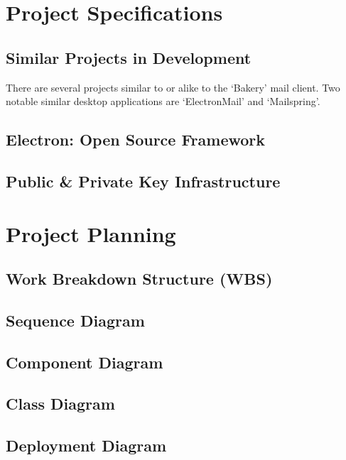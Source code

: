 \documentclass[12pt]{article}
\begin{document}
\section{Project Specifications}
	\subsection{Similar Projects in Development}
		There are several projects similar to or alike to the `Bakery' mail client. Two notable similar desktop applications are `ElectronMail'\cite{ElectronMail} and `Mailspring'\cite{Mailspring}.
	\subsection{Electron: Open Source Framework}
		\lipsum[1]
	\subsection{Public \& Private Key Infrastructure}
		\lipsum[1]
\pagebreak
\section{Project Planning}
	\lipsum[1]
	\pagebreak
	\subsection{Work Breakdown Structure (WBS)}
	\lipsum[1]
	\pagebreak
	\subsection{Sequence Diagram}
	\lipsum[1]
	\pagebreak
	\subsection{Component Diagram}
	\lipsum[1]
	\pagebreak
	\subsection{Class Diagram}
	\lipsum[1]
	\pagebreak
	\subsection{Deployment Diagram}
	\lipsum[1]
\pagebreak


\end{document}
